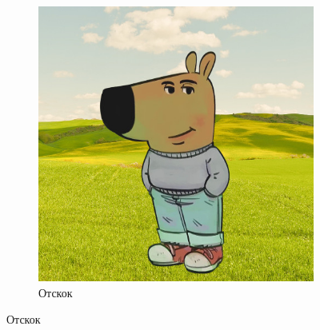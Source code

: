 \begin{figure}[H]
\begin{subfigure}[t]{0.45\textwidth}
		\includegraphics[width=\textwidth]{figures/chill-guy.jpeg}
		\caption{Отскок}
		\label{fig:sub2}
	\end{subfigure}
	
	\vspace{1em}
	

\end{figure}
